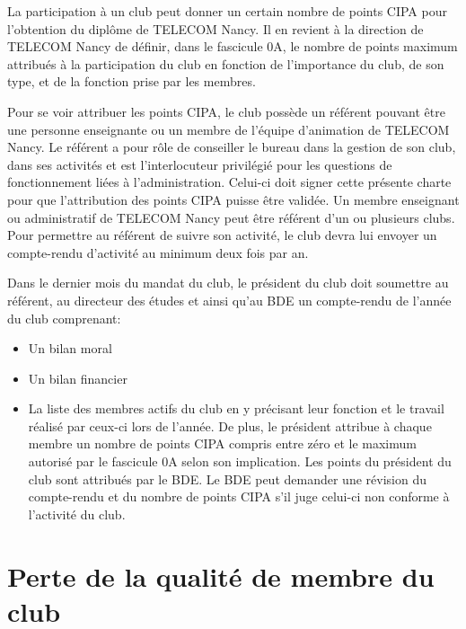 \documentclass{article} %
\begin{document}
\begin{multicols}{2}
		{\small

			La participation à un club peut donner un certain nombre de
			points CIPA pour l’obtention du diplôme de TELECOM
			Nancy. Il en revient à la direction de TELECOM Nancy de
			définir, dans le fascicule 0A, le nombre de points maximum
			attribués à la participation du club en fonction de
			l’importance du club, de son type, et de la fonction prise par
			les membres.

			Pour se voir attribuer les points CIPA, le club possède un
			référent pouvant être une personne enseignante ou un
			membre de l’équipe d’animation de TELECOM Nancy. Le
			référent a pour rôle de conseiller le bureau dans la gestion
			de son club, dans ses activités et est l’interlocuteur privilégié
			pour les questions de fonctionnement liées à
			l’administration. Celui-ci doit signer cette présente charte
			pour que l’attribution des points CIPA puisse être validée.
			Un membre enseignant ou administratif de TELECOM Nancy
			peut être référent d’un ou plusieurs clubs. Pour permettre
			au référent de suivre son activité, le club devra lui envoyer
			un compte-rendu d’activité au minimum deux fois par an.

			Dans le dernier mois du mandat du club, le président du
			club doit soumettre au référent, au directeur des études et
			ainsi qu’au BDE un compte-rendu de l’année du club
			comprenant:

			\begin{itemize}
				\item Un bilan moral
				\item Un bilan financier
				\item La liste des membres actifs du club en y précisant
					leur fonction et le travail réalisé par ceux-ci lors de
					l’année. De plus, le président attribue à chaque
					membre un nombre de points CIPA compris entre
					zéro et le maximum autorisé par le fascicule 0A
					selon son implication. Les points du président du
					club sont attribués par le BDE\@.
					Le BDE peut demander une révision du compte-rendu et du
					nombre de points CIPA s’il juge celui-ci non conforme à
					l’activité du club.
			\end{itemize}

		}
		
		\section{Perte de la qualité de membre du club}


\end{multicols}
\end{document}
